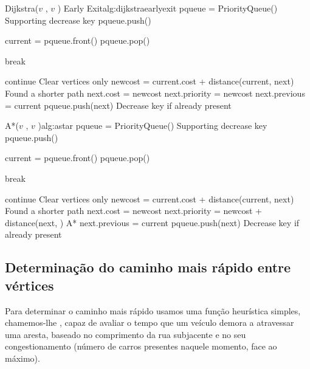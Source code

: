 \documentclass[relatorio.tex]{subfiles}
\begin{document}
\begin{algor}{Dijkstra($v$ , $v$ ) \Comment Early Exit}{alg:dijkstraearlyexit}
\State pqueue = PriorityQueue() \Comment Supporting decrease key
\State pqueue.push()

    \State current = pqueue.front()
    \State pqueue.pop()

        \State break
    \EndIf

            \State continue \Comment Clear vertices only
        \EndIf
        \State newcost = current.cost + distance(current, next)
         \Comment Found a shorter path
            \State next.cost = newcost
            \State next.priority = newcost
            \State next.previous = current
            \State pqueue.push(next) \Comment Decrease key if already present
        \EndIf
    \EndFor
\EndWhile
\end{algor}

\begin{algor}{A*($v$ , $v$ )}{alg:astar}
\State pqueue = PriorityQueue() \Comment Supporting decrease key
\State pqueue.push()

    \State current = pqueue.front()
    \State pqueue.pop()

        \State break
    \EndIf

            \State continue \Comment Clear vertices only
        \EndIf
        \State newcost = current.cost + distance(current, next)
         \Comment Found a shorter path
            \State next.cost = newcost
            \State next.priority = newcost + distance(next, ) \Comment A*
            \State next.previous = current
            \State pqueue.push(next) \Comment Decrease key if already present
        \EndIf
    \EndFor
\EndWhile
\end{algor}


\FloatBarrier
\subsection{Determinação do caminho mais rápido entre vértices}
\label{subsec:fastestpath}

Para determinar o caminho mais rápido usamos uma função heurística simples,
chamemos-lhe , capaz de avaliar o tempo que um veículo demora a
atravessar uma aresta, baseado no comprimento da rua subjacente e no seu
congestionamento (número de carros presentes naquele momento, face ao máximo).
\end{document}
